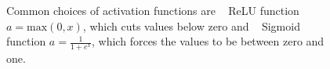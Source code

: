 \begin{figure}
\centering
{}
\caption{Common choices of activation functions are ~ ReLU function $a=\mathrm{max}(0,x)$, which cuts values below zero and ~ Sigmoid function $a=\frac{1}{1+e^{x}}$, which forces the values to be between zero and one.}
\label{fig:activation}
\end{figure}
